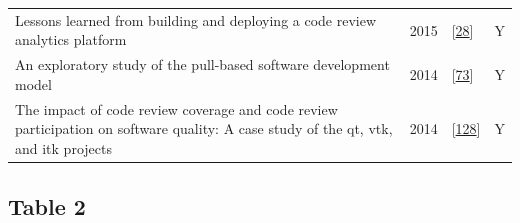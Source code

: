 \documentclass[]{book}
\begin{document}
\begin{longtable}[]{@{}llll@{}}
\begin{minipage}[t]{0.63\columnwidth}
Lessons learned from building and deploying a code review analytics
platform\strut
\end{minipage} & \begin{minipage}[t]{0.03\columnwidth}\raggedright\strut
2015\strut
\end{minipage} & \begin{minipage}[t]{0.14\columnwidth}\raggedright\strut
{[}\protect\hyperlink{ref-bird2015lessons}{28}{]}\strut
\end{minipage} & \begin{minipage}[t]{0.09\columnwidth}\raggedright\strut
Y\strut
\end{minipage}\tabularnewline
\begin{minipage}[t]{0.63\columnwidth}\raggedright\strut
An exploratory study of the pull-based software development model\strut
\end{minipage} & \begin{minipage}[t]{0.03\columnwidth}\raggedright\strut
2014\strut
\end{minipage} & \begin{minipage}[t]{0.14\columnwidth}\raggedright\strut
{[}\protect\hyperlink{ref-gousios2014exploratory}{73}{]}\strut
\end{minipage} & \begin{minipage}[t]{0.09\columnwidth}\raggedright\strut
Y\strut
\end{minipage}\tabularnewline
\begin{minipage}[t]{0.63\columnwidth}\raggedright\strut
The impact of code review coverage and code review participation on
software quality: A case study of the qt, vtk, and itk projects\strut
\end{minipage} & \begin{minipage}[t]{0.03\columnwidth}\raggedright\strut
2014\strut
\end{minipage} & \begin{minipage}[t]{0.14\columnwidth}\raggedright\strut
{[}\protect\hyperlink{ref-mcintosh2014impact}{128}{]}\strut
\end{minipage} & \begin{minipage}[t]{0.09\columnwidth}\raggedright\strut
Y\strut
\end{minipage}\tabularnewline
\bottomrule
\end{longtable}

\subsection{Table 2}\label{table-2}
\end{document}
